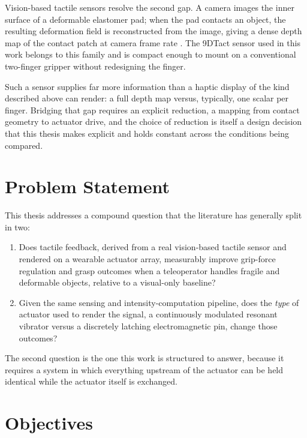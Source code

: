 \documentclass[12pt, a4paper, twoside, openright]{report}
\begin{document}
Vision-based tactile sensors resolve the second gap. A camera images the inner
surface of a deformable elastomer pad; when the pad contacts an object, the
resulting deformation field is reconstructed from the image, giving a dense
depth map of the contact patch at camera frame rate \cite{donggelsight2021,dahiya2010}. The 9DTact sensor used in
this work belongs to this family \cite{lin2023} and is compact enough to mount on a
conventional two-finger gripper without redesigning the finger.

Such a sensor supplies far more information than a haptic display of the kind
described above can render: a full depth map versus, typically, one scalar per
finger. Bridging that gap requires an explicit reduction, a mapping from
contact geometry to actuator drive, and the choice of reduction is itself a
design decision that this thesis makes explicit and holds constant across the
conditions being compared.

\section{Problem Statement}
\label{sec:problem-statement}

This thesis addresses a compound question that the literature has generally
split in two:

\begin{enumerate}[label=(\roman*)]
    \item Does tactile feedback, derived from a real vision-based tactile sensor
          and rendered on a wearable actuator array, measurably improve
          grip-force regulation and grasp outcomes when a teleoperator handles
          fragile and deformable objects, relative to a visual-only baseline?
    \item Given the same sensing and intensity-computation pipeline, does the
          \emph{type} of actuator used to render the signal, a continuously
          modulated resonant vibrator versus a discretely latching
          electromagnetic pin, change those outcomes?
\end{enumerate}

The second question is the one this work is structured to answer, because it
requires a system in which everything upstream of the actuator can be held
identical while the actuator itself is exchanged.

\section{Objectives}
\label{sec:objectives}
\end{document}
